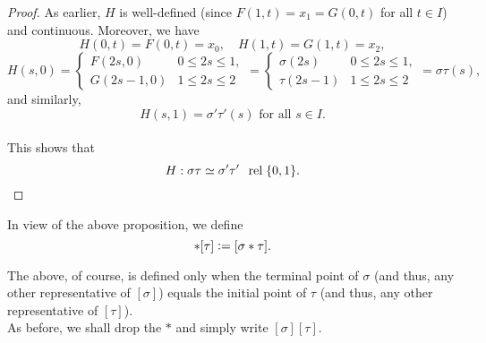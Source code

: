 \documentclass[12pt]{article}
\newcommand{\rel}{\;\;\operatorname{rel}\;}
\begin{document}
\begin{proof}
	As earlier, $H$ is well-defined (since $F(1, t) = x_1 = G(0, t)$ for all $t \in I$) and continuous. Moreover, we have
	\begin{equation*} 
		H(0, t) = F(0, t) = x_0, \quad H(1, t) = G(1, t) = x_2,
	\end{equation*}
	\begin{equation*} 
		H(s, 0)= \begin{cases}
				F(2s, 0) & 0 \le 2s \le 1,\\
				G(2s - 1, 0) & 1 \le 2s \le 2
			\end{cases} = \begin{cases}
				\sigma(2s) & 0 \le 2s \le 1,\\
				\tau(2s - 1) & 1 \le 2s \le 2
			\end{cases} = \sigma\tau(s),
	\end{equation*}
	and similarly, 
	\begin{equation*} 
		H(s, 1) = \sigma'\tau'(s)\text{ for all }s \in I.
	\end{equation*}\\
	This shows that 
	\begin{equation*} 
		H : \sigma\tau\simeq\sigma'\tau' \rel \{0, 1\}. \qedhere
	\end{equation*}
\end{proof}
\begin{defn}
	In view of the above proposition, we define
	\begin{equation*} 
		[\sigma]*[\tau] \vcentcolon= [\sigma*\tau].
	\end{equation*}
\end{defn}
The above, of course, is defined only when the terminal point of $\sigma$ (and thus, any other representative of $[\sigma]$) equals the initial point of $\tau$ (and thus, any other representative of $[\tau]$).\\
As before, we shall drop the $*$ and simply write $[\sigma][\tau].$
\end{document}
